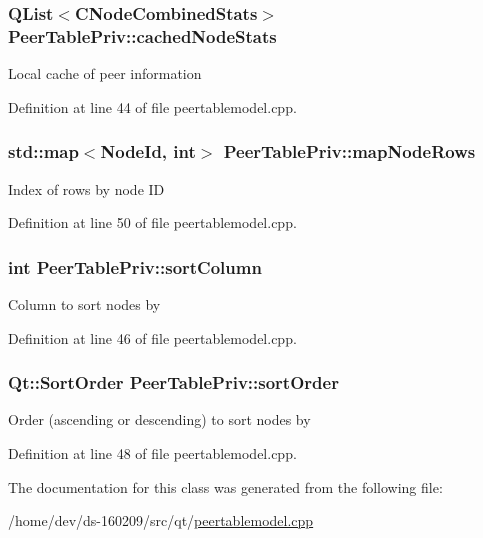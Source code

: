 \subsubsection[{cached\+Node\+Stats}]{\setlength{\rightskip}{0pt plus 5cm}Q\+List$<${\bf C\+Node\+Combined\+Stats}$>$ Peer\+Table\+Priv\+::cached\+Node\+Stats}\label{class_peer_table_priv_a8da9d0256d11f205dfa1cdce86843761}
Local cache of peer information 

Definition at line 44 of file peertablemodel.\+cpp.

\hypertarget{class_peer_table_priv_ae27db14bcbe769f494c4db56ef27fb08}{}
\subsubsection[{map\+Node\+Rows}]{\setlength{\rightskip}{0pt plus 5cm}std\+::map$<${\bf Node\+Id}, int$>$ Peer\+Table\+Priv\+::map\+Node\+Rows}\label{class_peer_table_priv_ae27db14bcbe769f494c4db56ef27fb08}
Index of rows by node I\+D 

Definition at line 50 of file peertablemodel.\+cpp.

\hypertarget{class_peer_table_priv_a4917597853d2d5f0055be017b8ab33c5}{}
\subsubsection[{sort\+Column}]{\setlength{\rightskip}{0pt plus 5cm}int Peer\+Table\+Priv\+::sort\+Column}\label{class_peer_table_priv_a4917597853d2d5f0055be017b8ab33c5}
Column to sort nodes by 

Definition at line 46 of file peertablemodel.\+cpp.

\hypertarget{class_peer_table_priv_adb95d4bbc4fb13a21a360108aeca5c32}{}
\subsubsection[{sort\+Order}]{\setlength{\rightskip}{0pt plus 5cm}Qt\+::\+Sort\+Order Peer\+Table\+Priv\+::sort\+Order}\label{class_peer_table_priv_adb95d4bbc4fb13a21a360108aeca5c32}
Order (ascending or descending) to sort nodes by 

Definition at line 48 of file peertablemodel.\+cpp.



The documentation for this class was generated from the following file\+:\begin{DoxyCompactItemize}
\item 
/home/dev/ds-\/160209/src/qt/\hyperlink{peertablemodel_8cpp}{peertablemodel.\+cpp}\end{DoxyCompactItemize}

